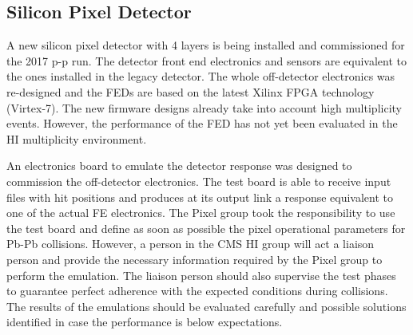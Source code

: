 \subsection{Silicon Pixel Detector\label{subsec:SiPixel}}
A new silicon pixel detector with 4 layers is being installed and commissioned for the 2017 p-p run. The detector front end electronics and sensors are equivalent to the ones installed in the legacy detector. The whole off-detector electronics was re-designed and the FEDs are based on the latest Xilinx FPGA technology (Virtex-7). The new firmware designs already take into account high multiplicity events. However, the performance of the FED has not yet been evaluated in the HI multiplicity environment. 

An electronics board to emulate the detector response was designed to commission the off-detector electronics. The test board is able to receive input files with hit positions and produces at its output link a response equivalent to one of the actual FE electronics. The Pixel group took the responsibility to use the test board and define as soon as possible the pixel operational parameters for Pb-Pb collisions. However, a person in the CMS HI group will act a liaison person and provide the necessary information required by the Pixel group to perform the emulation. The liaison person should also supervise the test phases to guarantee perfect adherence with the expected conditions during collisions. The results of the emulations should be evaluated carefully and possible solutions identified in case the performance is below expectations. 
